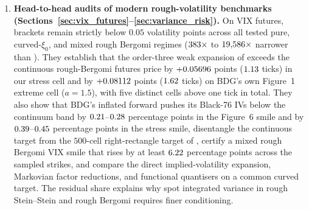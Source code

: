 \begin{enumerate}
  outward-rounded 169-bit Arb ball arithmetic \citep{Johansson2017,Johansson2018} using
  Pfaff-transformed ${}_2F_1$ inner products, positive-integral second-derivative remainder bounds
  (\RoughCertTilt{}), a Minkowski $L^2$ spatial and $z$-perturbation lemma evaluated across all Gaussian
  panels via one C-level FLINT \texttt{arb\_mat} multiplication (\RoughCertCV{}), piecewise-convexity
  Jensen/secant integration with rigorous Cauchy--Schwarz tail bounds ($<2\times10^{-10}$ points at
  $Z_{\max}=10$), and Arb-verified Black-76 inversion propagating forward-price uncertainty.
\item \textbf{Head-to-head \RoughCert{} audits of modern rough-volatility benchmarks
  (Sections~\ref{sec:vix_futures}--\ref{sec:variance_risk}).}
  On VIX futures, \RoughCert{} brackets remain strictly below $0.05$ volatility points across all
  tested pure, curved-$\xi_0$, and mixed rough Bergomi regimes ($383\times$ to $19{,}586\times$ narrower
  than \citealp[Theorem~3.3]{JacquierMartiniMuguruza2018}). They establish that the order-three weak
  expansion of \citet{BourgeyDeMarcoGobet2023} exceeds the continuous rough-Bergomi futures price by
  $+0.05696$ points ($1.13$ ticks) in our stress cell and by $+0.08112$ points ($1.62$
  ticks) on BDG's own Figure~1 extreme cell ($a=1.5$), with five distinct cells above one tick in total.
  They also show that BDG's inflated forward pushes its Black-76 IVs below the continuum band by
  $0.21$--$0.28$ percentage points in the Figure~6 smile and by
  $0.39$--$0.45$ percentage points in the stress smile, disentangle the continuous
  target from the $500$-cell right-rectangle target of \citet{BourgeyDeMarco2022}, certify a mixed rough
  Bergomi VIX smile that rises by at least $6.22$ percentage points across the sampled strikes, and compare
  the direct implied-volatility expansion, Markovian factor reductions, and functional quantisers on a
  common curved target. The residual share explains why spot integrated variance in rough Stein--Stein
  \citep{AbiJaber2022} and rough Bergomi requires finer conditioning.
\end{enumerate}


